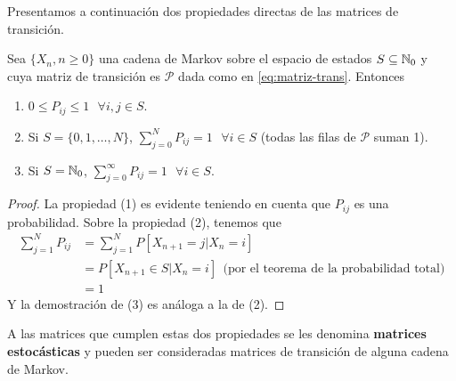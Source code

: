 Presentamos a continuación dos propiedades directas de las matrices de transición.

\begin{proposicion}
    \label{prop:propiedades-matrices-markov}
Sea $\{X_n, n\geq 0\}$ una cadena de Markov sobre el espacio de estados $S\subseteq \mathbb{N}_0$ y cuya matriz de transición es $\mathcal P$ dada como en \eqref{eq:matriz-trans}. Entonces
\begin{enumerate}
    \item $0\leq P_{ij} \leq 1 \ \ \ \forall i,j\in S$.
    \item Si $S=\{0,1,\dots,N\}$, $\displaystyle\sum_{j=0}^N P_{ij} = 1 \ \ \ \forall i\in S$ (todas las filas de $\mathcal P$ suman 1).
    \item Si $S=\mathbb{N}_0$, $\displaystyle\sum_{j=0}^\infty P_{ij} = 1 \ \ \ \forall i\in S$.
\end{enumerate}
\end{proposicion}
\begin{proof}
    La propiedad (1) es evidente teniendo en cuenta que $P_{ij}$ es una probabilidad. Sobre la propiedad (2), tenemos que
    \begin{equation*}
        \begin{split}
            \sum_{j=1}^N P_{ij} &= \sum_{j=1}^N P[X_{n+1}=j|X_n=i] \\
            &= P[X_{n+1}\in S|X_n=i] \ \ \text{(por el teorema de la probabilidad total)} \\
            &= 1
        \end{split}
    \end{equation*}
    Y la demostración de (3) es análoga a la de (2).
\end{proof}

A las matrices que cumplen estas dos propiedades se les denomina \textbf{matrices estocásticas} y pueden ser consideradas matrices de transición de alguna cadena de Markov.


